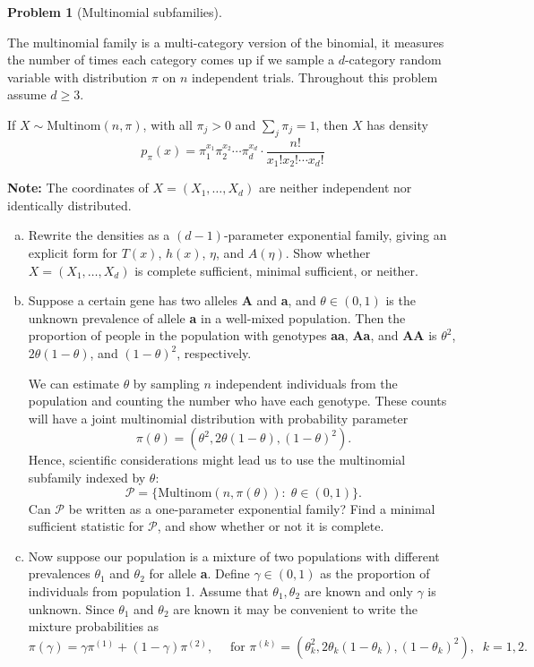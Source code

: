 \documentclass{article}
\newcommand{\cP}{\mathcal{P}}
\theoremstyle{definition}
\newtheorem{problem}{Problem}
\begin{document}
\begin{problem}[Multinomial subfamilies]
  \label{prob:multinomial-subfamilies}

  The multinomial family is a multi-category version of the binomial, it measures the number of times each category comes up if we sample a $d$-category random variable with distribution $\pi$ on $n$ independent trials. Throughout this problem assume $d \geq 3$.

  If $X \sim \text{Multinom}(n, \pi)$, with all $\pi_j > 0$ and $\sum_j \pi_j = 1$, then $X$ has density
  \[
  p_\pi(x) = \pi_1^{x_1}\pi_2^{x_2}\cdots \pi_d^{x_d} \cdot \frac{n!}{x_1! x_2! \cdots x_d!}
  \]
  
  {\bf Note:} The coordinates of $X=(X_1,\ldots,X_d)$ are neither independent nor identically distributed.

 \begin{enumerate}[(a)]
    
  \item Rewrite the densities as a $(d-1)$-parameter exponential family, giving an explicit form for $T(x)$, $h(x)$, $\eta$, and $A(\eta)$. Show whether $X=(X_1,\ldots,X_d)$ is complete sufficient, minimal sufficient, or neither.

    
  
  \item Suppose a certain gene has two alleles {\bf A} and {\bf a}, and $\theta\in (0,1)$ is the unknown prevalence of allele {\bf a} in a well-mixed population. Then the proportion of people in the population with genotypes {\bf aa}, {\bf Aa}, and {\bf AA} is $\theta^2$, $2\theta(1-\theta)$, and $(1-\theta)^2$, respectively.

    We can estimate $\theta$ by sampling $n$ independent individuals from the population and counting the number who have each genotype. These counts will have a joint multinomial distribution with probability parameter
    \[
    \pi(\theta) = (\theta^2, 2\theta(1-\theta), (1-\theta)^2).
    \]
    Hence, scientific considerations might lead us to use the multinomial subfamily indexed by $\theta$:
    \[
    \cP = \{\text{Multinom}(n,\pi(\theta)):\; \theta \in (0,1)\}.
    \]
    Can $\cP$ be written as a one-parameter exponential family? Find a minimal sufficient statistic for $\cP$, and show whether or not it is complete.

    


  \item Now suppose our population is a mixture of two populations with different prevalences $\theta_1$ and $\theta_2$ for allele {\bf a}. Define $\gamma \in (0,1)$ as the proportion of individuals from population 1. Assume that $\theta_1,\theta_2$ are known and only $\gamma$ is unknown. Since $\theta_1$ and $\theta_2$ are known it may be convenient to write the mixture probabilities as
    \[
    \pi(\gamma) = \gamma\pi^{(1)} + (1-\gamma)\pi^{(2)}, \quad \text{ for } \pi^{(k)} = (\theta_k^2, 2\theta_k(1-\theta_k), (1-\theta_k)^2), \;\;k=1,2.
    \]


\end{enumerate}
\end{problem}
\end{document}
